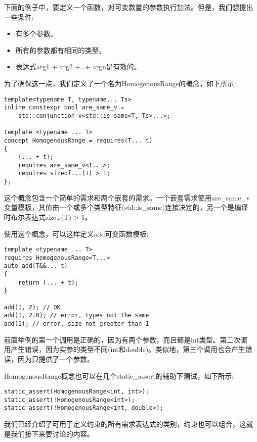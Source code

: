 下面的例子中，要定义一个函数，对可变数量的参数执行加法。但是，我们想提出一些条件:

\begin{itemize}
\item
有多个参数。

\item
所有的参数都有相同的类型。

\item
表达式arg1 + arg2 +…+ argn是有效的。
\end{itemize}

为了确保这一点，我们定义了一个名为HomogenousRange的概念，如下所示:

\begin{lstlisting}[style=styleCXX]
template<typename T, typename... Ts>
inline constexpr bool are_same_v =
	std::conjunction_v<std::is_same<T, Ts>...>;
	
template <typename ... T>
concept HomogenousRange = requires(T... t)
{
	(... + t);
	requires are_same_v<T...>;
	requires sizeof...(T) > 1;
};
\end{lstlisting}

这个概念包含一个简单的需求和两个嵌套的需求。一个嵌套需求使用are\_same\_v变量模板，其值由一个或多个类型特征(std::is\_same)连接决定的，另一个是编译时布尔表达式size…(T) > 1。

使用这个概念，可以这样定义add可变函数模板:

\begin{lstlisting}[style=styleCXX]
template <typename ... T>
requires HomogenousRange<T...>
auto add(T&&... t)
{
	return (... + t);
}

add(1, 2); // OK
add(1, 2.0); // error, types not the same
add(1); // error, size not greater than 1
\end{lstlisting}

前面举例的第一个调用是正确的，因为有两个参数，而且都是int类型。第二次调用产生错误，因为实参的类型不同(int和double)。类似地，第三个调用也会产生错误，因为只提供了一个参数。

HomogenousRange概念也可以在几个static\_assert的辅助下测试，如下所示:

\begin{lstlisting}[style=styleCXX]
static_assert(HomogenousRange<int, int>);
static_assert(!HomogenousRange<int>);
static_assert(!HomogenousRange<int, double>);
\end{lstlisting}

我们已经介绍了可用于定义约束的所有需求表达式的类别，约束也可以组合，这就是我们接下来要讨论的内容。

















